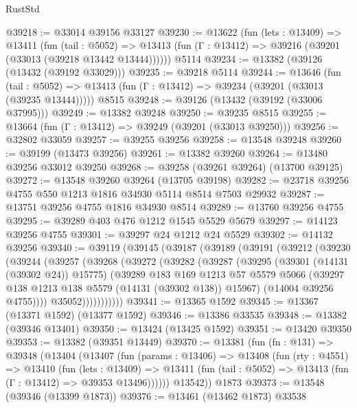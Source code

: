 \begin{lexlean}{RustStd}
\begin{coremodule}
@39218 := @33014 @39156 @33127
@39230 := @13622
    (fun (lets : @13409) =>
    @13411
      (fun (tail : @5052) =>
      @13413 (fun (Γ : @13412) => @39216 (@39201 (@33013 (@39218 @13442 @13444))))))
    @5114
@39234 := @13382 (@39126 (@13432 (@39192 @33029)))
@39235 := @39218 @5114
@39244 := @13646
    (fun (tail : @5052) => @13413 (fun (Γ : @13412) => @39234 (@39201 (@33013 (@39235 @13444)))))
    @8515
@39248 := @39126 (@13432 (@39192 (@33006 @37995)))
@39249 := @13382 @39248
@39250 := @39235 @8515
@39255 := @13664 (fun (Γ : @13412) => @39249 (@39201 (@33013 @39250)))
@39256 := @32802 @33059
@39257 := @39255 @39256
@39258 := @13548 @39248
@39260 := @39199 (@13473 @39256)
@39261 := @13382 @39260
@39264 := @13480 @39256 @33012 @39250
@39268 := @39258 (@39261 @39264) (@13700 @39125)
@39272 := @13548 @39260 @39264 (@13705 @39198)
@39282 := @23718 @39256 @4755 @550 @1213 @1816 @34930 @5114 @8514 @7503 @29932
@39287 := @13751 @39256 @4755 @1816 @34930 @8514
@39289 := @13760 @39256 @4755
@39295 := @39289 @403 @476 @1212 @1545 @5529 @5679
@39297 := @14123 @39256 @4755
@39301 := @39297 @24 @1212 @24 @5529
@39302 := @14132 @39256
@39340 := @39119
    (@39145
      (@39187
        (@39189
          (@39191
            (@39212
              (@39230
                (@39244
                  (@39257
                    (@39268
                      (@39272
                        (@39282
                          (@39287
                            (@39295
                              (@39301 (@14131 (@39302 @24)) @15775)
                              (@39289
                                @183
                                @169
                                @1213
                                @57
                                @5579
                                @5066
                                (@39297 @138 @1213 @138 @5579 (@14131 (@39302 @138)) @15967)
                                (@14004 @39256 @4755))))
                          @35052)))))))))))
@39341 := @13365 @1592
@39345 := @13367 (@13371 @1592) (@13377 @1592)
@39346 := @13386 @33535
@39348 := @13382 (@39346 @13401)
@39350 := @13424 (@13425 @1592)
@39351 := @13420 @39350
@39353 := @13382 (@39351 @13449)
@39370 := @13381
    (fun (fn : @131) =>
    @39348
      (@13404
        (@13407
          (fun (params : @13406) =>
          @13408
            (fun (rty : @4551) =>
            @13410
              (fun (lets : @13409) =>
              @13411 (fun (tail : @5052) => @13413 (fun (Γ : @13412) => @39353 @13496))))))
        @13542))
    @1873
@39373 := @13548 (@39346 (@13399 @1873))
@39376 := @13461 (@13462 @1873) @33538

\end{coremodule}
\end{lexlean}
